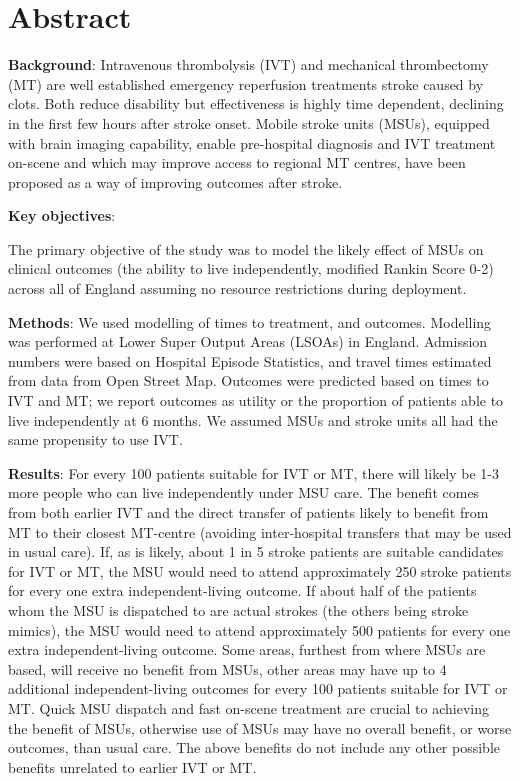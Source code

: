 \section*{Abstract}

\textbf{Background}: Intravenous thrombolysis (IVT) and mechanical thrombectomy (MT) are well established emergency reperfusion treatments stroke caused by clots. Both reduce disability but effectiveness is  highly time dependent, declining in the first few hours after stroke onset. Mobile stroke units (MSUs), equipped with brain imaging capability, enable pre-hospital diagnosis and IVT treatment on-scene and which may improve access to regional MT centres, have been proposed as a way of improving outcomes after stroke.

\textbf{Key objectives}:

The primary objective of the study was to model the likely effect of MSUs on clinical outcomes (the ability to live independently, modified Rankin Score 0-2) across all of England assuming no resource restrictions during deployment. 

\textbf{Methods}: We used modelling of times to treatment, and outcomes. Modelling was performed at Lower Super Output Areas (LSOAs) in England. Admission numbers were based on Hospital Episode Statistics, and travel times estimated from data from Open Street Map. Outcomes were predicted based on times to IVT and MT; we report outcomes as utility or the proportion of patients able to live independently at 6 months. We assumed MSUs and stroke units all had the same propensity to use IVT.

\textbf{Results}: For every 100 patients suitable for IVT or MT, there will likely be 1-3 more people who can live independently under MSU care. The benefit comes from both earlier IVT and the direct transfer of patients likely to benefit from MT to their closest MT-centre (avoiding inter-hospital transfers that may be used in usual care). If, as is likely, about 1 in 5 stroke patients are suitable candidates for IVT or MT, the MSU would need to attend approximately 250 stroke patients for every one extra independent-living outcome. If about half of the patients whom the MSU is dispatched to are actual strokes (the others being stroke mimics), the MSU would need to attend approximately 500 patients for every one extra independent-living outcome. Some areas, furthest from where MSUs are based, will receive no benefit from MSUs, other areas may have up to 4 additional independent-living outcomes for every 100 patients suitable for IVT or MT. Quick MSU dispatch and fast on-scene treatment are crucial to achieving the benefit of MSUs, otherwise use of MSUs may have no overall benefit, or worse outcomes, than usual care. The above benefits do not include any other possible benefits unrelated to earlier IVT or MT.

